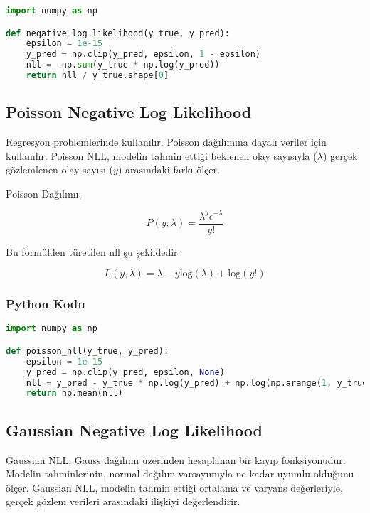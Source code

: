 \begin{lstlisting}[language=Python]
import numpy as np

def negative_log_likelihood(y_true, y_pred):
    epsilon = 1e-15
    y_pred = np.clip(y_pred, epsilon, 1 - epsilon)
    nll = -np.sum(y_true * np.log(y_pred))
    return nll / y_true.shape[0]
\end{lstlisting}

\newpage

\subsection{Poisson Negative Log Likelihood}

Regresyon problemlerinde kullanılır. Poisson dağılımına dayalı veriler için kullanılır. Poisson NLL, modelin tahmin ettiği beklenen olay sayısıyla ($\lambda$) gerçek gözlemlenen olay sayısı ($y$) arasındaki farkı ölçer. 

Poisson Dağılımı;

\[ P(y; \lambda) = \frac{\lambda^y \epsilon^{-\lambda}}{y!} \]

Bu formülden türetilen nll şu şekildedir:

\[ L(y, \lambda) = \lambda - y \text{log}(\lambda) + \text{log}(y!) \]

\subsubsection{Python Kodu}

\begin{lstlisting}[language=Python]
import numpy as np

def poisson_nll(y_true, y_pred):
    epsilon = 1e-15
    y_pred = np.clip(y_pred, epsilon, None)
    nll = y_pred - y_true * np.log(y_pred) + np.log(np.arange(1, y_true.max() + 1).prod())
    return np.mean(nll)
\end{lstlisting}

\newpage

\subsection{Gaussian Negative Log Likelihood}

Gaussian NLL, Gauss dağılımı üzerinden hesaplanan bir kayıp fonksiyonudur. Modelin tahminlerinin, normal dağılım varsayımıyla ne kadar uyumlu olduğunu ölçer. Gaussian NLL, modelin tahmin ettiği ortalama ve varyans değerleriyle, gerçek gözlem verileri arasındaki ilişkiyi değerlendirir.

